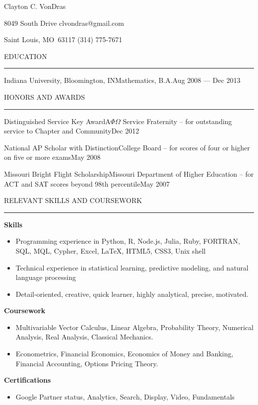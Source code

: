 \documentclass[24pt, letterpaper]{article}
\makeatletter
\newcommand{\name}{Clayton C. VonDras}
\newcommand{\street}{8049 South Drive}
\newcommand{\city}{Saint Louis, MO}
\newcommand{\postal}{63117}
\newcommand{\phone}{(314) 775-7671}
\newcommand{\email}{clvondras@gmail.com}
\newcommand{\sectiontitle}[1]{\begin{minipage}{\textwidth}\begin{center}\Large\MakeUppercase{#1}\end{center}\vspace{-5.5mm}\rule{\linewidth}{0.25mm}\vspace{2mm}\end{minipage}}
\newenvironment{tightressection}[1]{
  \begin{minipage}{\textwidth}
  \sectiontitle{#1}}
  {\end{minipage}}
\newcommand{\resitem}[1]{

\item \begin{flushleft} #1 \end{flushleft}
}
\makeatother
\begin{document}
\centerline{{\Huge \name}}

\vspace{-24pt} \street {} \email

\city\ \postal {} \phone

\vspace{24pt}

\begin{tightressection}{education}
\begin{resedentry}{Indiana University, Bloomington, IN}{Mathematics, B.A.}{Aug 2008 --- Dec 2013}
\end{resedentry}
\end{tightressection}

\begin{tightressection}{Honors and Awards}
\begin{resedentry}{Distinguished Service Key Award}{A$\Phi\Omega$ Service Fraternity -- for outstanding service to Chapter and Community}{Dec 2012}
\end{resedentry}
\begin{resedentry}{National AP Scholar with Distinction}{College Board -- for scores of four or higher on five or more exams}{May 2008}
\end{resedentry}
\begin{resedentry}{Missouri Bright Flight Scholarship}{Missouri Department of Higher Education -- for ACT and SAT scores beyond 98th percentile}{May 2007}
\end{resedentry}
\end{tightressection}

\begin{tightressection}{Relevant Skills and Coursework}
\textbf{Skills}
\begin{itemize}[noitemsep,nolistsep]
\resitem{Programming experience in Python, R, Node.js, Julia, Ruby, FORTRAN, SQL, MQL, Cypher, Excel, \LaTeX, HTML5, CSS3, Unix shell}
\resitem{Technical experience in statistical learning, predictive modeling, and natural language processing}
\resitem{Detail-oriented, creative, quick learner, highly analytical, precise, motivated.}
\end{itemize}

\textbf{Coursework}
\begin{itemize}[noitemsep, nolistsep]
\resitem{Multivariable Vector Calculus, Linear Algebra, Probability Theory, Numerical Analysis, Real Analysis, Classical Mechanics.}
\resitem{Econometrics, Financial Economics, Economics of Money and Banking, Financial Accounting, Options Pricing Theory.}
\end{itemize}

\textbf{Certifications}
\begin{itemize}[noitemsep, nolistsep]
\resitem{Google Partner status, Analytics, Search, Display, Video, Fundamentals}
\vspace{2.5mm}
\end{itemize}

\end{tightressection}
\end{document}
